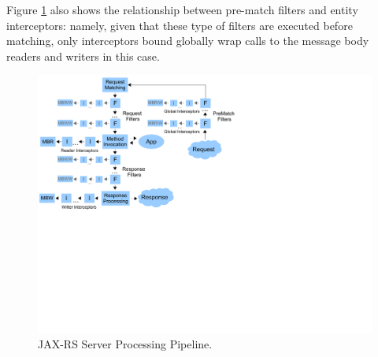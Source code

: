 Figure \ref{jaxrs_pipeline} also shows the relationship between pre-match filters and entity interceptors: namely, given that these type of filters are executed before matching, only interceptors bound globally wrap calls to the message body readers and writers in this case.

\begin{figure}[H]
\centering
\includegraphics{chapters/jaxrs_pipeline.pdf}
\caption{JAX-RS Server Processing Pipeline.}
\label{jaxrs_pipeline}
\end{figure}


